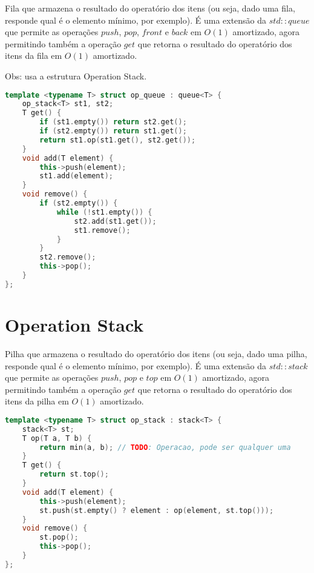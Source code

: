 \documentclass[11pt, a4paper, oneside]{book}
\begin{document}
Fila que armazena o resultado do operatório dos itens (ou seja, dado uma fila, responde qual é o elemento mínimo, por exemplo). É uma extensão da $std::queue$ que permite as operações $push$, $pop$, $front$ e $back$ em $O(1)$ amortizado, agora permitindo também a operação $get$ que retorna o resultado do operatório dos itens da fila em $O(1)$ amortizado.



Obs: usa a estrutura Operation Stack.

\hfill

\begin{multicols}{2}
\begin{lstlisting}[language=C++]
template <typename T> struct op_queue : queue<T> {
    op_stack<T> st1, st2;
    T get() {
        if (st1.empty()) return st2.get();
        if (st2.empty()) return st1.get();
        return st1.op(st1.get(), st2.get());
    }
    void add(T element) {
        this->push(element);
        st1.add(element);
    }
    void remove() {
        if (st2.empty()) {
            while (!st1.empty()) {
                st2.add(st1.get());
                st1.remove();
            }
        }
        st2.remove();
        this->pop();
    }
};
\end{lstlisting}
\end{multicols}

\hfill

\section{Operation Stack}


Pilha que armazena o resultado do operatório dos itens (ou seja, dado uma pilha, responde qual é o elemento mínimo, por exemplo). É uma extensão da $std::stack$ que permite as operações $push$, $pop$ e $top$ em $O(1)$ amortizado, agora permitindo também a operação $get$ que retorna o resultado do operatório dos itens da pilha em $O(1)$ amortizado.

\hfill

\begin{multicols}{2}
\begin{lstlisting}[language=C++]
template <typename T> struct op_stack : stack<T> {
    stack<T> st;
    T op(T a, T b) {
        return min(a, b); // TODO: Operacao, pode ser qualquer uma
    }
    T get() {
        return st.top();
    }
    void add(T element) {
        this->push(element);
        st.push(st.empty() ? element : op(element, st.top()));
    }
    void remove() {
        st.pop();
        this->pop();
    }
};\end{lstlisting}
\end{multicols}
\end{document}
